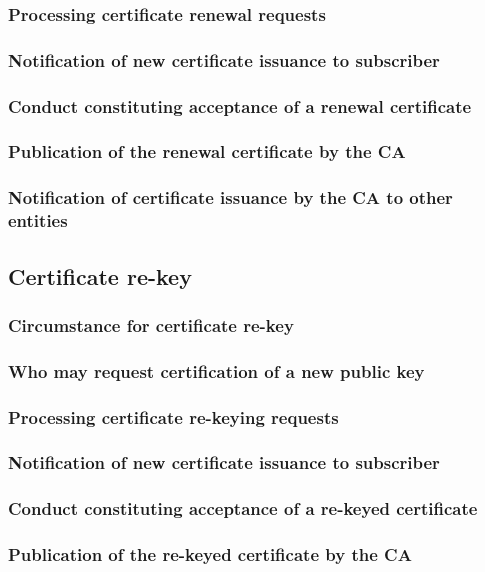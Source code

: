 \documentclass[10pt]{article}
\begin{document}
\subsubsection{Processing certificate renewal requests}
\subsubsection{Notification of new certificate issuance to subscriber}
\subsubsection{Conduct constituting acceptance of a renewal certificate}
\subsubsection{Publication of the renewal certificate by the CA}
\subsubsection{Notification of certificate issuance by the CA to other entities}
\subsection{Certificate re-key}
\subsubsection{Circumstance for certificate re-key}
\subsubsection{Who may request certification of a new public key}
\subsubsection{Processing certificate re-keying requests}
\subsubsection{Notification of new certificate issuance to subscriber}
\subsubsection{Conduct constituting acceptance of a re-keyed certificate}
\subsubsection{Publication of the re-keyed certificate by the CA}
\end{document}
